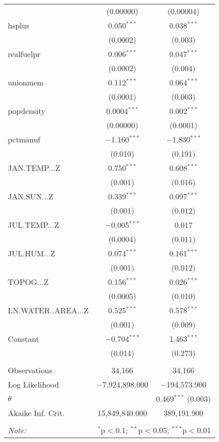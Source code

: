 \begin{table}[!htbp]
\begin{tabular}{@{\extracolsep{5pt}}lcc}
  & (0.00000) & (0.00004) \\ 
  hsplus & 0.050$^{***}$ & 0.038$^{***}$ \\ 
  & (0.0002) & (0.003) \\ 
  realfuelpr & 0.006$^{***}$ & 0.047$^{***}$ \\ 
  & (0.0002) & (0.004) \\ 
  unionmem & 0.112$^{***}$ & 0.064$^{***}$ \\ 
  & (0.0001) & (0.003) \\ 
  popdensity & 0.0004$^{***}$ & 0.002$^{***}$ \\ 
  & (0.00000) & (0.0001) \\ 
  pctmanuf & $-$1.160$^{***}$ & $-$1.830$^{***}$ \\ 
  & (0.010) & (0.191) \\ 
  JAN.TEMP...Z & 0.750$^{***}$ & 0.608$^{***}$ \\ 
  & (0.001) & (0.016) \\ 
  JAN.SUN...Z & 0.339$^{***}$ & 0.097$^{***}$ \\ 
  & (0.001) & (0.012) \\ 
  JUL.TEMP...Z & $-$0.005$^{***}$ & 0.017 \\ 
  & (0.0004) & (0.011) \\ 
  JUL.HUM...Z & 0.074$^{***}$ & 0.161$^{***}$ \\ 
  & (0.001) & (0.012) \\ 
  TOPOG...Z & 0.156$^{***}$ & 0.026$^{***}$ \\ 
  & (0.0005) & (0.010) \\ 
  LN.WATER..AREA...Z & 0.525$^{***}$ & 0.578$^{***}$ \\ 
  & (0.001) & (0.009) \\ 
  Constant & $-$0.704$^{***}$ & 1.463$^{***}$ \\ 
  & (0.014) & (0.273) \\ 
 \hline \\[-1.8ex] 
Observations & 34,166 & 34,166 \\ 
Log Likelihood & $-$7,924,898.000 & $-$194,573.900 \\ 
$\theta$ &  & 0.469$^{***}$  (0.003) \\ 
Akaike Inf. Crit. & 15,849,840.000 & 389,191.900 \\ 
\hline 
\hline \\[-1.8ex] 
\textit{Note:}  & \multicolumn{2}{r}{$^{*}$p$<$0.1; $^{**}$p$<$0.05; $^{***}$p$<$0.01} \\ 
\end{tabular} 
\end{table} 
